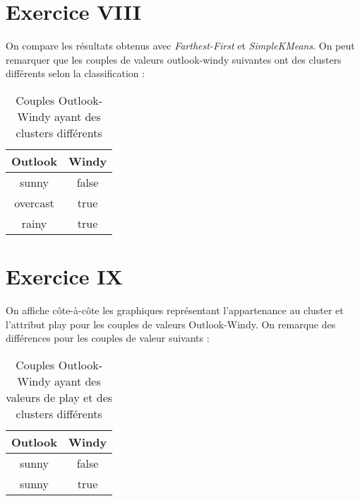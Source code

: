 \documentclass[a4paper, 11pt]{report}
\begin{document}
        \section{Exercice VIII}
        On compare les résultats obtenus avec \emph{Farthest-First} et \emph{SimpleKMeans}. On peut remarquer que les couples de valeurs outlook-windy suivantes ont des clusters différents selon la classification : 
        \begin{table}[h!]
        \centering
        \begin{tabular}{| c | c |}
         \hline
         Outlook & Windy \\
         \hline
         sunny & false \\
         overcast & true \\
         rainy & true\\
         \hline
        
        \end{tabular}
        \caption{Couples Outlook-Windy ayant des clusters différents}
        \label{tab:exo8}
        \end{table}
        
        \section{Exercice IX}
        On affiche côte-à-côte les graphiques représentant l'appartenance au cluster et l'attribut play pour les couples de valeurs Outlook-Windy.
        On remarque des différences pour les couples de valeur suivants :
        \begin{table}[h!]
        \centering
        \begin{tabular}{| c | c |}
         \hline
         Outlook & Windy \\
         \hline
         sunny & false \\
         sunny & true \\
         \hline
        
        \end{tabular}
        \caption{Couples Outlook-Windy ayant des valeurs de play et des clusters différents}
        \label{tab:exo9}
        \end{table}
        
\end{document}
